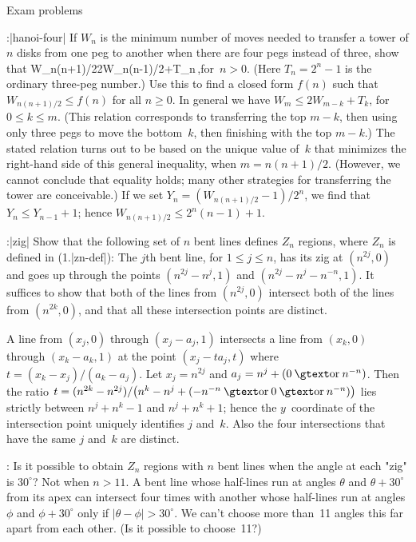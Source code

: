 \subhead Exam problems

\ex:\exref|hanoi-four|%
If $W_n$ is the minimum number of moves needed to transfer a tower
of $n$ disks from one peg to another when there are four pegs instead
of three, show that
\begindisplay
W_{n(n+1)/2}\le 2W_{n(n-1)/2}+T_n\,,\qquad\hbox{for $n>0$.}
\enddisplay
(Here $T_n=2^n-1$ is the ordinary three-peg number.)
Use this to find a closed form $f(n)$ such that $W_{n(n+1)/2}\le f(n)$
for all $n\ge0$.
\answer In general we have $W_m\le 2W_{m-k}+T_k$, for $0\le k\le m$. (This
relation corresponds to transferring the top $m-k$, then using only
three pegs to move the bottom~$k$, then finishing with the top $m-k$.)
The stated relation turns out to be based on the unique value of~$k$ that
minimizes the right-hand side of this general inequality, when $m=n(n+1)/2$.
(However, we cannot conclude that equality holds; many other
strategies for transferring the tower are conceivable.)
If we set $Y_n=(W_{n(n+1)/2}-1)/2^n$, we find that $Y_n\le Y_{n-1}+1$;
hence $W_{n(n+1)/2}\le2^n(n-1)+1$.

\ex:\exref|zig|%
Show that the following set of $n$ bent lines defines $Z_n$ regions,
where $Z_n$ is defined in \equ(1.|zn-def|):
The $j$th bent line, for $1\le j\le n$, has its zig at $(n^{2j},0)$
and goes up through the points $(n^{2j}-n^j,1)$ and $(n^{2j}-n^j-n^{-n},1)$.
\answer It suffices to show that both of the lines from $(n^{2j},0)$
intersect both of the lines from $(n^{2k},0)$, and that all these intersection
points are distinct.\par
\def\OR{\mathbin{\rm or}}
A line from $(x_j,0)$ through $(x_j-a_j,1)$ intersects a line
from $(x_k,0)$ through $(x_k-a_k,1)$ at the point $(x_j-ta_j,t)$ where
$t=(x_k-x_j)/(a_k-a_j)$. Let $x_j=n^{2j}$ and
$a_j=n^j+(0\OR n^{-n})$. Then the ratio $t=(n^{2k}-n^{2j})/\allowbreak
{\bigl(n^k-n^j+(-n^{-n}\OR 0\OR n^{-n})\bigr)}$ lies strictly between
$n^j+n^k-1$ and $n^j+n^k+1$; hence the $y$~coordinate of the intersection
point uniquely identifies $j$ and~$k$. Also the four intersections that
have the same $j$ and~$k$ are distinct.

\ex:
Is it possible to obtain $Z_n$ regions with $n$ bent lines when the
angle at each "zig" is $30^\circ$?
\answer Not when $n>11$. A bent line whose half-lines run at angles
$\theta$ and $\theta+30^\circ$ from its apex can intersect four times
with another whose half-lines run at angles $\phi$ and $\phi+30^\circ$
only if $\vert\theta-\phi\vert>30^\circ$. We can't choose more than~11
angles this far apart from each other. (Is it possible to choose~11?)

